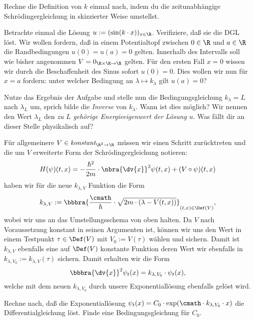 \documentclass{subfiles}
\begin{document}
        \begin{Aufgabe}
            \nr{} Rechne die Definition von $k$ einmal nach, indem du die zeitunabhängige Schrödingergleichung in skizzierter Weise umstellst. 

            \nr{} Betrachte einmal die Lösung $u:=(\sin(k\cdot x))_{x\in\R}$. Verifiziere, daß sie die DGL löst. Wir wollen fordern, daß in einem Potentialtopf zwischen $0\in\R$ und $a\in\R$ die Randbedingungen $u(0) = u(a) = 0$ gelten. Innerhalb des Intervalls soll wie bisher angenommen $V = 0_{\R\times\R\to\R}$ gelten. Für den ersten Fall $x=0$ wissen wir durch die Beschaffenheit des Sinus sofort $u(0) = 0$. Dies wollen wir nun für $x=a$ fordern: unter welcher Bedingung an $\lambda\mapsto k_\lambda$ gilt $u(a) = 0$? 

            \nr{} Nutze das Ergebnis der Aufgabe und stelle nun die Bedingungsgleichung $k_\lambda = L$ nach $\lambda_L$ um, sprich bilde die \emph{Inverse} von $k_\lambda$. Wann ist dies möglich? Wir nennen den Wert $\lambda_L$ den \emph{zu $L$ gehörige Energieeigenwert der Lösung $u$}. Was fällt dir an dieser Stelle physikalisch auf? 
        \end{Aufgabe}
        Für allgemeinere $V\in\textit{konstant}_{\R^2\to\R}$ müssen wir einen Schritt zurücktreten und die um $V$ erweiterte Form der Schrödingergleichung notieren: 
        \[H(\psi)(t,x) = -\frac{\hbar^2}{2m}\cdot\nbra{\dv{x}}^2\psi(t,x) + (V\circ \psi)(t,x)\]
        haben wir für die neue $k_{\lambda,V}$ Funktion die Form 
        \[k_{\lambda,V}:=\bbbra{\frac{\cmath}{\hbar}\cdot\sqrt{2m\cdot(\lambda - V(t,x))}}_{(t,x)\in\Def(V)},\]
        wobei wir uns an das Umstellungsschema von oben halten. Da $V$ nach Voraussetzung konstant in seinen Argumenten ist, können wir uns den Wert in einem Testpunkt $\tau\in\Def(V)$ mit $V_0:=V(\tau)$ wählen und sichern. Damit ist $k_{\lambda,V}$ ebenfalls eine auf $\Def(V)$ konstante Funktion deren Wert wir ebenfalls in $k_{\lambda,V_0}:=k_{\lambda,V}(\tau)$ sichern. Damit erhalten wir die Form
        \[\bbbra{\dv{x}}^2\psi_t(x) = k_{\lambda,V_0}\cdot\psi_t(x),\]
        welche mit dem neuen $k_{\lambda,V_0}$ durch unsere Exponentiallösung ebenfalls gelöst wird. 
        \begin{Aufgabe}
            \nr{} Rechne nach, daß die Exponentiallösung $\psi_t(x) = C_0\cdot{\exp}(\cmath\cdot k_{\lambda,V_0}\cdot x)$ die Differentialgleichung löst. Finde eine Bedingungsgleichung für $C_0$. 
        \end{Aufgabe}
        
\end{document}
